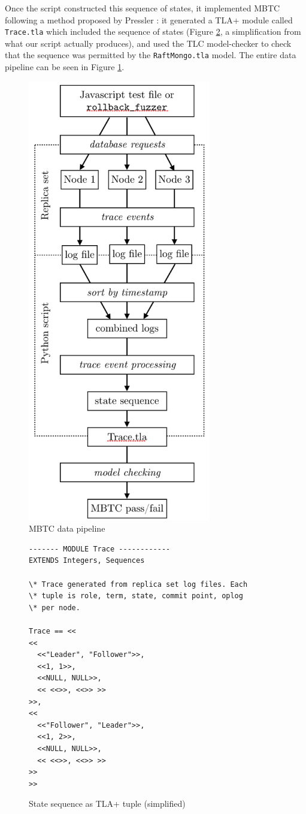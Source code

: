 \documentclass{vldb}
\begin{document}
Once the script constructed this sequence of states, it implemented MBTC following a method proposed by Pressler \cite{Pressler18VerifyingSoftwareTracesTLAPlus}: it generated a TLA+ module called \texttt{Trace.tla} which included the sequence of states (Figure \ref{fig:state-sequence}, a simplification from what our script actually produces), and used the TLC model-checker to check that the sequence was permitted by the \texttt{RaftMongo.tla} model. The entire data pipeline can be seen in Figure \ref{figure:MBTC-pipline}.

\begin{figure}
\includegraphics[width=8cm]{MBTC-pipeline.png}
\caption{MBTC data pipeline}
\label{figure:MBTC-pipline}
\end{figure}

\begin{figure}
\begin{verbatim}
------- MODULE Trace ------------
EXTENDS Integers, Sequences

\* Trace generated from replica set log files. Each
\* tuple is role, term, state, commit point, oplog
\* per node.

Trace == <<
<<
  <<"Leader", "Follower">>,
  <<1, 1>>,
  <<NULL, NULL>>,
  << <<>>, <<>> >>
>>,
<<
  <<"Follower", "Leader">>,
  <<1, 2>>,
  <<NULL, NULL>>,
  << <<>>, <<>> >>
>>
>>
\end{verbatim}
\caption{State sequence as TLA+ tuple (simplified)}
\label{fig:state-sequence}
\end{figure}
\end{document}
